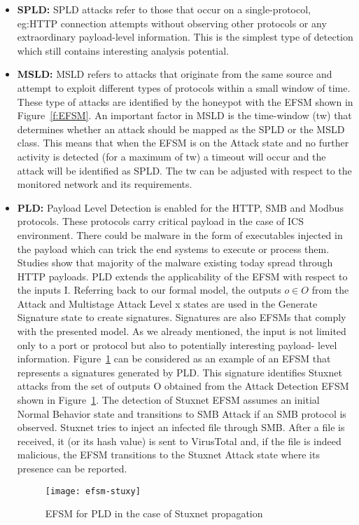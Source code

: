 \documentclass[article,msc=informatik,type=msc,colorback,accentcolor=tud9c]{tudthesis}
\begin{document}
  \begin{itemize}
   
    
 \item\textbf{SPLD:} SPLD attacks refer to those that occur on a single-protocol, eg:HTTP connection attempts without observing other protocols or any extraordinary payload-level information. This is the simplest type of detection which still contains interesting analysis potential. 
  
  \item\textbf{MSLD:} MSLD refers to attacks that originate from the same source and attempt to exploit different types of protocols within a small window of time. These type of attacks are identified by the honeypot with the \ac{EFSM} shown in Figure~\ref{f:EFSM}. An important factor in MSLD is the time-window (tw) that determines whether an attack should be mapped as the \ac{SPLD} or the \ac{MSLD} class. This means that when the
  \ac{EFSM} is on the Attack state and no further activity is detected (for a maximum of tw)   a timeout will occur and the attack will be identified as \ac{SPLD}. The tw can be adjusted with respect to the monitored network and its requirements.
  
  \item\textbf{PLD:} Payload Level Detection is enabled for the \ac{HTTP}, \ac{SMB} and Modbus protocols. These protocols carry critical payload in the case of \ac{ICS} environment. There could be malware in the form of executables injected in the payload which can trick the end systems to execute or process them. Studies show that majority of the malware existing today spread through HTTP payloads. \ac{PLD} extends the applicability of the \ac{EFSM} with respect to the inputs I. Referring back to our formal model, the outputs $o \in O$ from the Attack and Multistage Attack Level x states are used in the Generate Signature state to create signatures. Signatures are also \ac{EFSM}s that comply with the presented model. As we already mentioned, the input is not limited only to a port or protocol but also to potentially interesting payload- level information. Figure~\ref{f:EFSM-stuxy} can be considered as an example of an \ac{EFSM} that represents a signatures generated by \ac{PLD}. This signature identifies Stuxnet attacks from the set of outputs O obtained from the Attack Detection \ac{EFSM} shown in Figure~\ref{f:EFSM-stuxy}. The detection of Stuxnet
  \ac{EFSM} assumes an initial Normal Behavior state and transitions to \ac{SMB} Attack if an \ac{SMB} protocol is observed. Stuxnet tries to inject an infected file through \ac{SMB}. After a file is received, it (or its hash value) is sent to VirusTotal and, if the file is indeed malicious, the \ac{EFSM} transitions to the Stuxnet Attack state where its presence can be reported.
  
  \begin{figure}[h]
          \centering
          \texttt{[image: efsm-stuxy]}
          \caption[EFSM for PLD in the case of Stuxnet propagation.]{\label{f:EFSM-stuxy}EFSM for PLD in the case of Stuxnet propagation}
          \cite{1234567}
          \end{figure}
  
  
  \end{itemize}  
  
\end{document}
